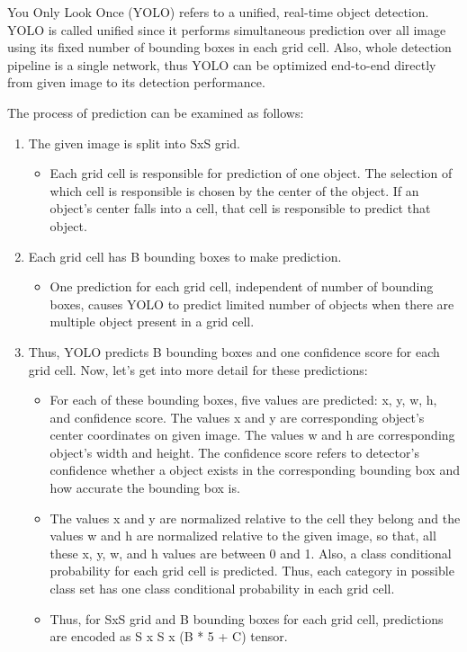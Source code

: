 \documentclass{article}
\begin{document}
\setlength{\parindent}{6ex}

\indent

You Only Look Once (YOLO) \cite{yolocite} refers to a unified, real-time object detection. 
YOLO is called unified since it performs simultaneous prediction over 
all image using its fixed number of bounding boxes in each grid cell. 
Also, whole detection pipeline is a single network, thus YOLO can be 
optimized end-to-end directly from given image to its detection performance.
\par

The process of prediction can be examined as follows:
\begin{enumerate}
    \item The given image is split into SxS grid.
    \begin{itemize}
        \item Each grid cell is responsible for prediction of one object.
The selection of which cell is responsible is chosen by the center of 
the object. If an object's center falls into a cell, that cell is 
responsible to predict that object.
    \end{itemize}
    \item Each grid cell has B bounding boxes to make prediction.
    \begin{itemize}
        \item One prediction for each grid cell, independent of number of 
bounding boxes, causes YOLO to predict limited number of objects when 
there are multiple object present in a grid cell.
    \end{itemize}
    \item Thus, YOLO predicts B bounding boxes and one confidence score for 
each grid cell. Now, let's get into more detail for these predictions:
    \begin{itemize}
        \item For each of these bounding boxes, five values are predicted:
x, y, w, h, and confidence score. The values x and y are corresponding object's 
center coordinates on given image. The values w and h are corresponding object's 
width and height. The confidence score refers to detector's confidence whether a 
object exists in the corresponding bounding box and how accurate the bounding box is.
        \item The values x and y are normalized relative to the cell they belong and 
the values w and h are normalized relative to the given image, so that, all these 
x, y, w, and h values are between 0 and 1. Also, a class conditional probability for 
each grid cell is predicted. Thus, each category in possible class set has one 
class conditional probability in each grid cell. 
        \item Thus, for SxS grid and B bounding boxes for each grid cell, 
predictions are encoded as S x S x (B * 5 + C) tensor.
    \end{itemize}
\end{enumerate}
\end{document}
